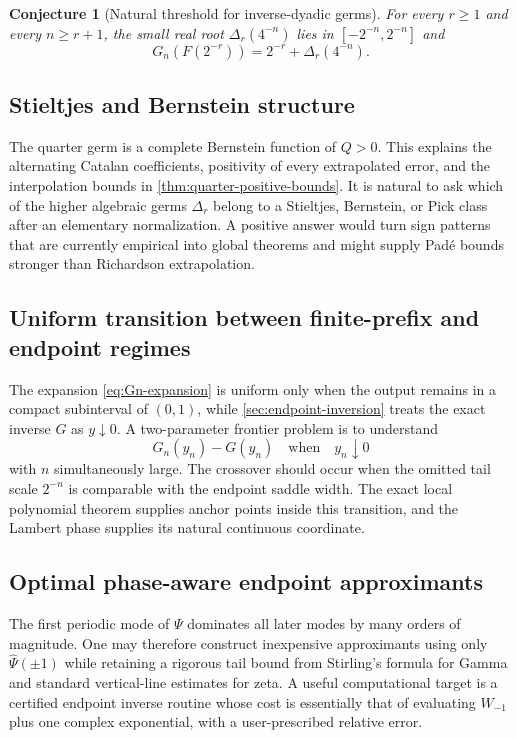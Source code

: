 \documentclass[11pt,oneside]{article}
\numberwithin{equation}{section}
\newtheorem{conjecture}[theorem]{Conjecture}
\theoremstyle{definition}
\theoremstyle{remark}
\begin{document}
\begin{conjecture}[Natural threshold for inverse-dyadic germs]
\label{conj:natural-threshold}
For every $r\ge1$ and every $n\ge r+1$, the small real root
$\Delta_r(4^{-n})$ lies in $[-2^{-n},2^{-n}]$ and
\[
 G_n(F(2^{-r}))=2^{-r}+\Delta_r(4^{-n}).
\]
\end{conjecture}

\subsection{Stieltjes and Bernstein structure}

The quarter germ is a complete Bernstein function of $Q>0$.  This explains the alternating
Catalan coefficients, positivity of every extrapolated error, and the interpolation bounds in
\cref{thm:quarter-positive-bounds}.  It is natural to ask which of the higher algebraic germs
$\Delta_r$ belong to a Stieltjes, Bernstein, or Pick class after an elementary normalization.
A positive answer would turn sign patterns that are currently empirical into global theorems
and might supply Pad\'e bounds stronger than Richardson extrapolation.

\subsection{Uniform transition between finite-prefix and endpoint regimes}

The expansion \eqref{eq:Gn-expansion} is uniform only when the output remains in a compact
subinterval of $(0,1)$, while \cref{sec:endpoint-inversion} treats the exact inverse $G$ as
$y\downarrow0$.  A two-parameter frontier problem is to understand
\begin{equation}
 G_n(y_n)-G(y_n)
 \quad\text{when}\quad y_n\downarrow0
 \label{eq:double-scaling-problem}
\end{equation}
with $n$ simultaneously large.  The crossover should occur when the omitted tail scale
$2^{-n}$ is comparable with the endpoint saddle width.  The exact local polynomial theorem
supplies anchor points inside this transition, and the Lambert phase supplies its natural
continuous coordinate.

\subsection{Optimal phase-aware endpoint approximants}

The first periodic mode of $\Psi$ dominates all later modes by many orders of magnitude.
One may therefore construct inexpensive approximants using only
$\widehat\Psi(\pm1)$ while retaining a rigorous tail bound from Stirling's formula for Gamma
and standard vertical-line estimates for zeta.  A useful computational target is a certified
endpoint inverse routine whose cost is essentially that of evaluating $W_{-1}$ plus one
complex exponential, with a user-prescribed relative error.
\end{document}
